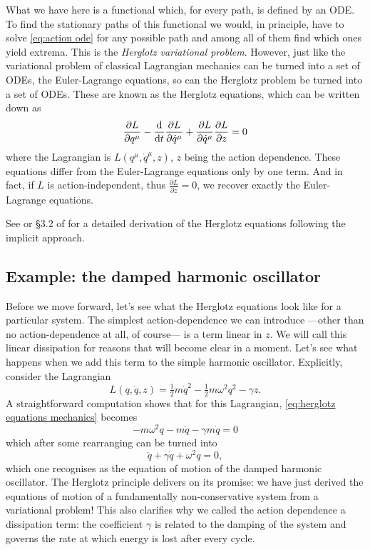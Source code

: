 \documentclass[../main.tex]{subfiles}
\begin{document}
What we have here is a functional which, for every path, is defined by an ODE. To find the
stationary paths of this functional we would, in principle, have to solve
\cref{eq:action ode} for any possible path and among all of them find which ones yield
extrema. This is the \emph{Herglotz variational problem}. However, just like the variational problem of classical Lagrangian mechanics can
be turned into a set of ODEs, the Euler-Lagrange equations, so can the Herglotz problem be
turned into a set of ODEs. These are known as the Herglotz equations, which can be written
down as
\begin{equation}\label{eq:herglotz equations mechanics}
	\frac{\partial L}{\partial q^\mu} - \frac{\mathrm{d}}{\mathrm{d} t}\frac{\partial L}{\partial \dot{q}^\mu}
	+\frac{\partial L}{\partial \dot{q}^\mu} \frac{\partial L}{\partial z} = 0
\end{equation}
where the Lagrangian is \( L(q^\mu, \dot{q}^\mu, z) \), \( z \) being the action
dependence. These equations differ from the Euler-Lagrange equations only by one term. And
in fact, if \( L \) is action-independent, thus \( \frac{\partial L}{\partial z} = 0 \),
we recover exactly the Euler-Lagrange equations. 

See \cite{Lazo2018} or \S 3.2 of \cite{Leon2021} for a detailed derivation of the Herglotz
equations following the implicit approach. 

\subsection{Example: the damped harmonic oscillator}
Before we move forward, let's see what the Herglotz equations look like for a particular
system. The simplest action-dependence we can introduce ---other than no
action-dependence at all, of course--- is a term linear in \( z \). We will call this
linear dissipation for reasons that will become clear in a moment. Let's see what happens
when we add this term to the simple harmonic oscillator. Explicitly, consider the
Lagrangian
\begin{equation*}
	L(q, \dot{q}, z) = \tfrac{1}{2}m\dot{q}^2 - \tfrac{1}{2} m\omega^2 q^2 - \gamma z. 
\end{equation*}
A straightforward computation shows that for this Lagrangian, \cref{eq:herglotz equations
mechanics} becomes
\begin{equation*}
	-m\omega^2 q - m\ddot{q} - \gamma m \dot{q} = 0
\end{equation*}
which after some rearranging can be turned into
\begin{equation}\label{eq:damped harmonic oscillator}
	\ddot{q} + \gamma\dot{q} + \omega^2 q = 0,
\end{equation}
which one recognises as the equation of motion of the damped harmonic oscillator. The
Herglotz principle delivers on its promise: we have just derived the equations of motion
of a fundamentally non-conservative system from a variational problem! This also clarifies
why we called the action dependence a dissipation term: the coefficient \( \gamma \) is
related to the damping of the system and governs the rate at which energy is lost after
every cycle. 
\end{document}
